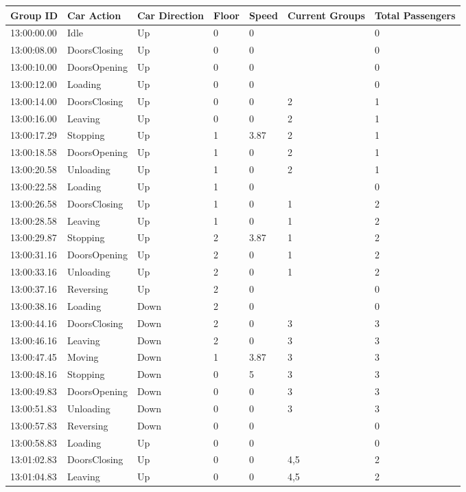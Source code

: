\documentclass{UoYCSproject}
\begin{document}
\begin{longtable}{l | l | l | l | l | l | l}
	Group ID & Car Action & Car Direction & Floor & Speed & Current Groups & Total Passengers \\
	\hline
	13:00:00.00 & Idle & Up & 0 & 0 &  & 0 \\
	13:00:08.00 & DoorsClosing & Up & 0 & 0 &  & 0 \\
	13:00:10.00 & DoorsOpening & Up & 0 & 0 &  & 0 \\
	13:00:12.00 & Loading & Up & 0 & 0 &  & 0 \\
	13:00:14.00 & DoorsClosing & Up & 0 & 0 & 2 & 1 \\
	13:00:16.00 & Leaving & Up & 0 & 0 & 2 & 1 \\
	13:00:17.29 & Stopping & Up & 1 & 3.87 & 2 & 1 \\
	13:00:18.58 & DoorsOpening & Up & 1 & 0 & 2 & 1 \\
	13:00:20.58 & Unloading & Up & 1 & 0 & 2 & 1 \\
	13:00:22.58 & Loading & Up & 1 & 0 &  & 0 \\
	13:00:26.58 & DoorsClosing & Up & 1 & 0 & 1 & 2 \\
	13:00:28.58 & Leaving & Up & 1 & 0 & 1 & 2 \\
	13:00:29.87 & Stopping & Up & 2 & 3.87 & 1 & 2 \\
	13:00:31.16 & DoorsOpening & Up & 2 & 0 & 1 & 2 \\
	13:00:33.16 & Unloading & Up & 2 & 0 & 1 & 2 \\
	13:00:37.16 & Reversing & Up & 2 & 0 &  & 0 \\
	13:00:38.16 & Loading & Down & 2 & 0 &  & 0 \\
	13:00:44.16 & DoorsClosing & Down & 2 & 0 & 3 & 3 \\
	13:00:46.16 & Leaving & Down & 2 & 0 & 3 & 3 \\
	13:00:47.45 & Moving & Down & 1 & 3.87 & 3 & 3 \\
	13:00:48.16 & Stopping & Down & 0 & 5 & 3 & 3 \\
	13:00:49.83 & DoorsOpening & Down & 0 & 0 & 3 & 3 \\
	13:00:51.83 & Unloading & Down & 0 & 0 & 3 & 3 \\
	13:00:57.83 & Reversing & Down & 0 & 0 &  & 0 \\
	13:00:58.83 & Loading & Up & 0 & 0 &  & 0 \\
	13:01:02.83 & DoorsClosing & Up & 0 & 0 & 4,5 & 2 \\
	13:01:04.83 & Leaving & Up & 0 & 0 & 4,5 & 2 \\

\end{longtable}
\end{document}

